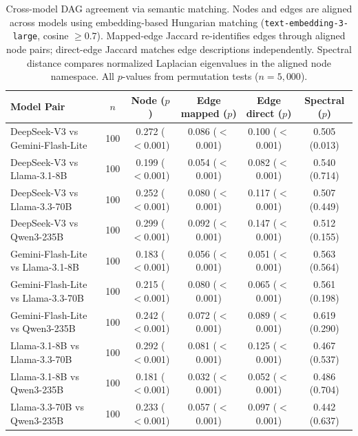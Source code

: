 \begin{table}[ht]
\centering
\caption{Cross-model DAG agreement via semantic matching. Nodes and edges are aligned across models using embedding-based Hungarian matching (\texttt{text-embedding-3-large}, cosine $\geq 0.7$). Mapped-edge Jaccard re-identifies edges through aligned node pairs; direct-edge Jaccard matches edge descriptions independently. Spectral distance compares normalized Laplacian eigenvalues in the aligned node namespace. All $p$-values from permutation tests ($n=5{,}000$).}
\label{tab:cross_model_agreement}
\small
\begin{tabular}{lccccc}
\toprule
Model Pair & $n$ & Node ($p$) & Edge mapped ($p$) & Edge direct ($p$) & Spectral ($p$) \\
\midrule
DeepSeek-V3 vs Gemini-Flash-Lite & 100 & 0.272 ($<$0.001) & 0.086 ($<$0.001) & 0.100 ($<$0.001) & 0.505 (0.013) \\
DeepSeek-V3 vs Llama-3.1-8B & 100 & 0.199 ($<$0.001) & 0.054 ($<$0.001) & 0.082 ($<$0.001) & 0.540 (0.714) \\
DeepSeek-V3 vs Llama-3.3-70B & 100 & 0.252 ($<$0.001) & 0.080 ($<$0.001) & 0.117 ($<$0.001) & 0.507 (0.449) \\
DeepSeek-V3 vs Qwen3-235B & 100 & 0.299 ($<$0.001) & 0.092 ($<$0.001) & 0.147 ($<$0.001) & 0.512 (0.155) \\
Gemini-Flash-Lite vs Llama-3.1-8B & 100 & 0.183 ($<$0.001) & 0.056 ($<$0.001) & 0.051 ($<$0.001) & 0.563 (0.564) \\
Gemini-Flash-Lite vs Llama-3.3-70B & 100 & 0.215 ($<$0.001) & 0.080 ($<$0.001) & 0.065 ($<$0.001) & 0.561 (0.198) \\
Gemini-Flash-Lite vs Qwen3-235B & 100 & 0.242 ($<$0.001) & 0.072 ($<$0.001) & 0.089 ($<$0.001) & 0.619 (0.290) \\
Llama-3.1-8B vs Llama-3.3-70B & 100 & 0.292 ($<$0.001) & 0.081 ($<$0.001) & 0.125 ($<$0.001) & 0.467 (0.537) \\
Llama-3.1-8B vs Qwen3-235B & 100 & 0.181 ($<$0.001) & 0.032 ($<$0.001) & 0.052 ($<$0.001) & 0.486 (0.704) \\
Llama-3.3-70B vs Qwen3-235B & 100 & 0.233 ($<$0.001) & 0.057 ($<$0.001) & 0.097 ($<$0.001) & 0.442 (0.637) \\
\bottomrule
\end{tabular}
\end{table}
